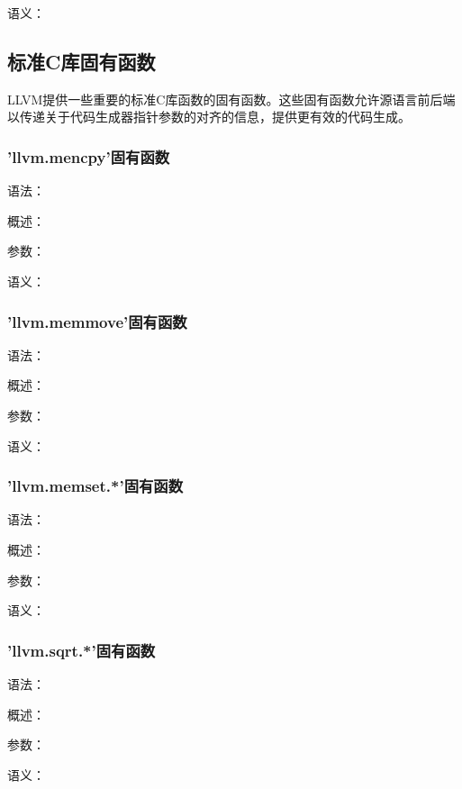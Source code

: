 \documentclass[12pt,a4paper]{article}
\begin{document}
{语义：


\subsection{标准C库固有函数}

LLVM提供一些重要的标准C库函数的固有函数。这些固有函数允许源语言前后端以传递关于代码生成器指针参数的对齐的信息，提供更有效的代码生成。

\subsubsection{'llvm.mencpy'固有函数} %

语法：

概述：

参数：

语义：


\subsubsection{'llvm.memmove'固有函数} %

语法：

概述：

参数：

语义：


\subsubsection{'llvm.memset.*'固有函数} %

语法：

概述：

参数：

语义：


\subsubsection{'llvm.sqrt.*'固有函数} %

语法：

概述：

参数：

语义：


}
\end{document}
